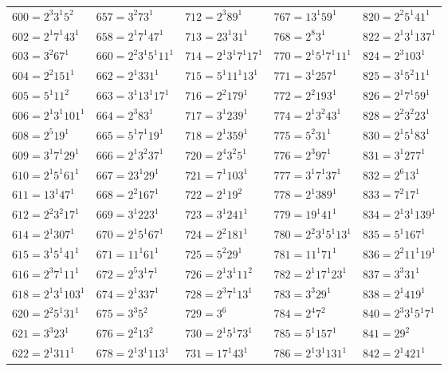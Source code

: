 {\begin{longtable}[c]{*{5}{l}}
$600=2^{3}3^{1}5^{2}$&$657=3^{2}73^{1}$&$712=2^{3}89^{1}$&$767=13^{1}59^{1}$&$820=2^{2}5^{1}41^{1}$\\
$602=2^{1}7^{1}43^{1}$&$658=2^{1}7^{1}47^{1}$&$713=23^{1}31^{1}$&$768=2^{8}3^{1}$&$822=2^{1}3^{1}137^{1}$\\
$603=3^{2}67^{1}$&$660=2^{2}3^{1}5^{1}11^{1}$&$714=2^{1}3^{1}7^{1}17^{1}$&$770=2^{1}5^{1}7^{1}11^{1}$&$824=2^{3}103^{1}$\\
$604=2^{2}151^{1}$&$662=2^{1}331^{1}$&$715=5^{1}11^{1}13^{1}$&$771=3^{1}257^{1}$&$825=3^{1}5^{2}11^{1}$\\
$605=5^{1}11^{2}$&$663=3^{1}13^{1}17^{1}$&$716=2^{2}179^{1}$&$772=2^{2}193^{1}$&$826=2^{1}7^{1}59^{1}$\\
$606=2^{1}3^{1}101^{1}$&$664=2^{3}83^{1}$&$717=3^{1}239^{1}$&$774=2^{1}3^{2}43^{1}$&$828=2^{2}3^{2}23^{1}$\\
$608=2^{5}19^{1}$&$665=5^{1}7^{1}19^{1}$&$718=2^{1}359^{1}$&$775=5^{2}31^{1}$&$830=2^{1}5^{1}83^{1}$\\
$609=3^{1}7^{1}29^{1}$&$666=2^{1}3^{2}37^{1}$&$720=2^{4}3^{2}5^{1}$&$776=2^{3}97^{1}$&$831=3^{1}277^{1}$\\
$610=2^{1}5^{1}61^{1}$&$667=23^{1}29^{1}$&$721=7^{1}103^{1}$&$777=3^{1}7^{1}37^{1}$&$832=2^{6}13^{1}$\\
$611=13^{1}47^{1}$&$668=2^{2}167^{1}$&$722=2^{1}19^{2}$&$778=2^{1}389^{1}$&$833=7^{2}17^{1}$\\
$612=2^{2}3^{2}17^{1}$&$669=3^{1}223^{1}$&$723=3^{1}241^{1}$&$779=19^{1}41^{1}$&$834=2^{1}3^{1}139^{1}$\\
$614=2^{1}307^{1}$&$670=2^{1}5^{1}67^{1}$&$724=2^{2}181^{1}$&$780=2^{2}3^{1}5^{1}13^{1}$&$835=5^{1}167^{1}$\\
$615=3^{1}5^{1}41^{1}$&$671=11^{1}61^{1}$&$725=5^{2}29^{1}$&$781=11^{1}71^{1}$&$836=2^{2}11^{1}19^{1}$\\
$616=2^{3}7^{1}11^{1}$&$672=2^{5}3^{1}7^{1}$&$726=2^{1}3^{1}11^{2}$&$782=2^{1}17^{1}23^{1}$&$837=3^{3}31^{1}$\\
$618=2^{1}3^{1}103^{1}$&$674=2^{1}337^{1}$&$728=2^{3}7^{1}13^{1}$&$783=3^{3}29^{1}$&$838=2^{1}419^{1}$\\
$620=2^{2}5^{1}31^{1}$&$675=3^{3}5^{2}$&$729=3^{6}$&$784=2^{4}7^{2}$&$840=2^{3}3^{1}5^{1}7^{1}$\\
$621=3^{3}23^{1}$&$676=2^{2}13^{2}$&$730=2^{1}5^{1}73^{1}$&$785=5^{1}157^{1}$&$841=29^{2}$\\
$622=2^{1}311^{1}$&$678=2^{1}3^{1}113^{1}$&$731=17^{1}43^{1}$&$786=2^{1}3^{1}131^{1}$&$842=2^{1}421^{1}$\\

\end{longtable}}
